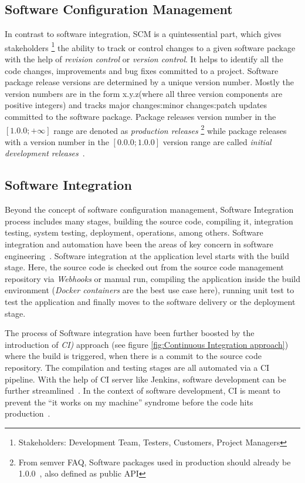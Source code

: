 \subsection{Software Configuration Management} \label{section:Softwareconfigurationmanagement}

In contrast to software integration, \ac{SCM} is a quintessential part, which gives stakeholders \footnote{Stakeholders: Development Team, Testers, Customers, Project Managers} the ability to track or control changes to a given software package with the help of \emph{revision control} or \emph{version control}. It helps to identify all the code changes, improvements and bug fixes committed to a project. Software package release versions are determined by a unique version number. Mostly the version numbers are in the form x.y.z(where all three version components are positive integers) and tracks major changes:minor changes:patch updates committed to the software package. Package releases version number in the $[1.0.0; +\infty]$ range are denoted as \emph{production releases} \footnote{From semver FAQ, Software packages used in production should already be 1.0.0~\parencite{preston2013semantic}, also defined as public API} while package releases with a version number in the $[0.0.0;1.0.0]$ version range are called \emph{initial development releases}~\parencite{8721084}.

\subsection{Software Integration}
\label{section:applicationsoftwareintegration}
Beyond the concept of software configuration management, Software Integration process includes many stages, building the source code, compiling it, integration testing, system testing, deployment, operations, among others. Software integration and automation have been the areas of key concern in software engineering~\parencite{vasilescu2015quality}. Software integration at the application level starts with the build stage. Here, the source code is checked out from the source code management repository via \emph{Webhooks} or manual run, compiling the application inside the build environment (\emph{Docker containers} are the best use case here), running unit test to test the application and finally moves to the software delivery or the deployment stage.

The process of Software integration have been further boosted by the introduction of \emph{\ac{CI})} approach (see figure \ref{fig:Continuous Integration approach}) where the build is triggered, when there is a commit to the source code repository. The compilation and testing stages are all automated via a \ac{CI} pipeline. With the help of \ac{CI} server like Jenkins, software development can be further streamlined~\parencite{smart2011jenkins}. In the context of software development, \ac{CI} is meant to prevent the “it works on my machine”  syndrome  before  the  code hits production~\parencite{6802994}.


